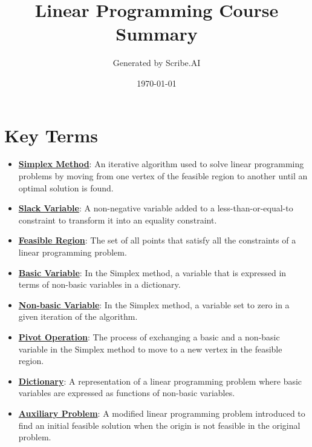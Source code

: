\documentclass{article}%
\title{Linear Programming Course Summary}%
\author{Generated by Scribe.AI}%
\date{\today}%
\begin{document}
%
\normalsize%
\maketitle%
\section{Key Terms}%
\label{sec:KeyTerms}%
\begin{itemize}[leftmargin=*]%
\item \href{https://www.math.purdue.edu/~yipn/421/2024-08-27-ExSimplex.pdf#page=1}{\textbf{Simplex Method}}: An iterative algorithm used to solve linear programming problems by moving from one vertex of the feasible region to another until an optimal solution is found.%
\item \href{https://www.math.purdue.edu/~yipn/421/2024-08-27-ExSimplex.pdf#page=1}{\textbf{Slack Variable}}: A non-negative variable added to a less-than-or-equal-to constraint to transform it into an equality constraint.%
\item \href{https://www.math.purdue.edu/~yipn/421/2024-08-27-ExSimplex.pdf#page=2}{\textbf{Feasible Region}}: The set of all points that satisfy all the constraints of a linear programming problem.%
\item \href{https://www.math.purdue.edu/~yipn/421/2024-08-27-ExSimplex.pdf#page=9}{\textbf{Basic Variable}}: In the Simplex method, a variable that is expressed in terms of non-basic variables in a dictionary.%
\item \href{https://www.math.purdue.edu/~yipn/421/2024-08-27-ExSimplex.pdf#page=6}{\textbf{Non{-}basic Variable}}: In the Simplex method, a variable set to zero in a given iteration of the algorithm.%
\item \href{https://www.math.purdue.edu/~yipn/421/2024-08-27-ExSimplex.pdf#page=9}{\textbf{Pivot Operation}}: The process of exchanging a basic and a non-basic variable in the Simplex method to move to a new vertex in the feasible region.%
\item \href{https://www.math.purdue.edu/~yipn/421/2024-08-27-ExSimplex.pdf#page=26}{\textbf{Dictionary}}: A representation of a linear programming problem where basic variables are expressed as functions of non-basic variables.%
\item \href{https://www.math.purdue.edu/~yipn/421/2024-08-27-ExSimplex.pdf#page=32}{\textbf{Auxiliary Problem}}: A modified linear programming problem introduced to find an initial feasible solution when the origin is not feasible in the original problem.%
\end{itemize}
\end{document}
